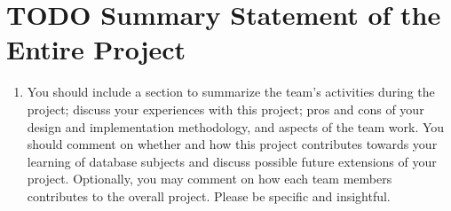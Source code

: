 \documentclass[11pt]{article}
\begin{document}
\section{\textbf{TODO} Summary Statement of the Entire Project}
\label{sec-13}

     
\begin{enumerate}
\item You should include a section to summarize the team's activities
     during the project; discuss your experiences with this project;
     pros and cons of your design and implementation methodology, and
     aspects of the team work. You should comment on whether and how
     this project contributes towards your learning of database
     subjects and discuss possible future extensions of your
     project. Optionally, you may comment on how each team members
     contributes to the overall project. Please be specific and
     insightful.
\end{enumerate}
\end{document}
